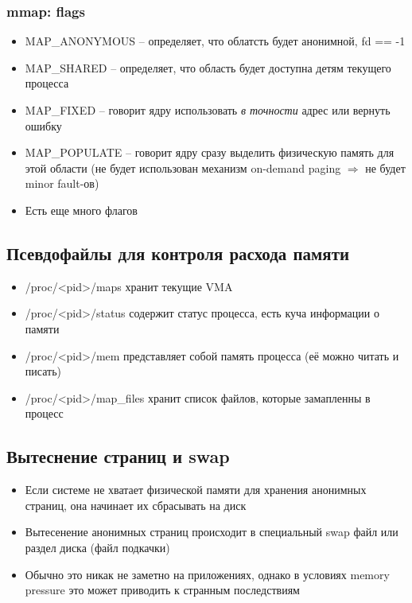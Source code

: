    \subsubsection{mmap: flags}
      \begin{itemize}
        \item MAP\_ANONYMOUS -- определяет, что облатсть будет анонимной, fd == -1
        \item MAP\_SHARED -- определяет, что область будет доступна детям текущего процесса
        \item MAP\_FIXED -- говорит ядру использовать \textit{в точности} адрес  или вернуть ошибку
        \item MAP\_POPULATE -- говорит ядру сразу выделить физическую память для этой области (не будет использован механизм on-demand paging $\Rightarrow$ не будет minor fault-ов)
        \item Есть еще много флагов
      \end{itemize}
    
    \subsection{Псевдофайлы для контроля расхода памяти}
      \begin{itemize}
        \item /proc/<pid>/maps хранит текущие VMA
        \item /proc/<pid>/status содержит статус процесса, есть куча информации о памяти
        \item /proc/<pid>/mem представляет собой память процесса (её можно читать и писать)
        \item /proc/<pid>/map\_files хранит список файлов, которые замапленны в процесс
      \end{itemize}
    
    \subsection{Вытеснение страниц и swap}
      \begin{itemize}
        \item Если системе не хватает физической памяти для хранения анонимных страниц, она начинает их сбрасывать на диск
        \item Вытесенение анонимных страниц происходит в специальный swap файл или раздел диска (файл подкачки)
        \item Обычно это никак не заметно на приложениях, однако в условиях memory pressure это может приводить к странным последствиям
      \end{itemize}